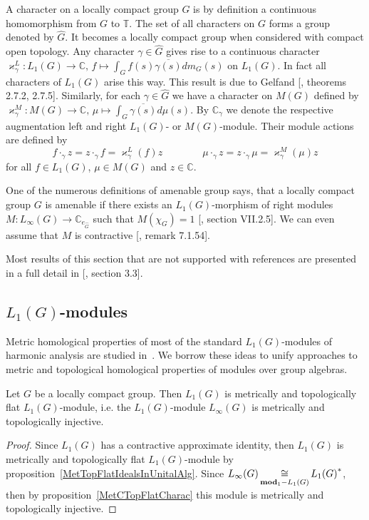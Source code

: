 A character on a locally compact group $G$ is by definition a continuous 
homomorphism from $G$ to $\mathbb{T}$. The set of all characters on $G$ forms a 
group denoted by $\widehat{G}$. It becomes a locally compact group when 
considered with compact open topology. Any character $\gamma\in\widehat{G}$ 
gives rise to a continuous character 
$\varkappa_\gamma^L:
L_1(G)\to\mathbb{C},\, 
f\mapsto \int_G f(s)\overline{\gamma(s)}dm_G(s)$ on $L_1(G)$. In fact all 
characters of $L_1(G)$ arise this way. This result is due to 
Gelfand [\cite{KaniBanAlg}, theorems 2.7.2, 2.7.5]. Similarly, for 
each $\gamma\in\widehat{G}$ we have a character on $M(G)$ defined by 
$\varkappa_\gamma^M:
M(G)\to\mathbb{C},\, 
\mu\mapsto\int_{G} \overline{\gamma(s)}d\mu(s)$. By $\mathbb{C}_\gamma$ we 
denote the respective augmentation left and right $L_1(G)$- or $M(G)$-module. 
Their module actions are defined by
$$
f\cdot_{\gamma}z=z\cdot_{\gamma}f=\varkappa_\gamma^L(f)z \qquad\qquad
\mu\cdot_{\gamma}z=z\cdot_{\gamma}\mu=\varkappa_\gamma^M(\mu)z
$$
for all $f\in L_1(G)$, $\mu\in M(G)$ and $z\in\mathbb{C}$. 

One of the numerous definitions of amenable group says, that a locally compact 
group $G$ is amenable if there exists an $L_1(G)$-morphism of right 
modules $M:L_\infty(G)\to\mathbb{C}_{e_{\widehat{G}}}$ such 
that $M(\chi_G)=1$ [\cite{HelBanLocConvAlg}, section VII.2.5]. We can even 
assume that $M$ is contractive [\cite{HelBanLocConvAlg}, remark 7.1.54].

Most results of this section that are not supported with references are 
presented in a full detail in [\cite{DalBanAlgAutCont}, section 3.3].


\subsection{
    \texorpdfstring{$L_1(G)$}{L1(G)}-modules}\label{
SubSectionL1GModules}

Metric homological properties of most of the standard $L_1(G)$-modules of 
harmonic analysis are studied in~\cite{GravInjProjBanMod}. We borrow these 
ideas to unify approaches to metric and topological homological properties 
of modules over group algebras.

\begin{proposition}\label{LInfIsL1MetrInj} Let $G$ be a locally compact group. 
Then $L_1(G)$ is metrically and topologically flat $L_1(G)$-module, 
i.e. the $L_1(G)$-module $L_\infty(G)$ is metrically and topologically injective.
\end{proposition} 
\begin{proof} Since $L_1(G)$ has a contractive approximate identity, 
then $L_1(G)$ is metrically and topologically flat $L_1(G)$-module 
by proposition~\ref{MetTopFlatIdealsInUnitalAlg}. 
Since $L_\infty(G)\mathop{\mathbin{\cong}}\limits_{\mathbf{mod}_1-L_1(G)}{L_1(G)}^*$, then by 
proposition~\ref{MetCTopFlatCharac} this module is metrically and topologically injective.
\end{proof}

